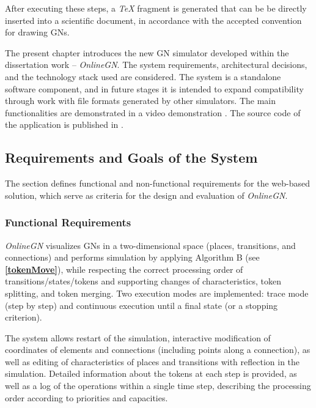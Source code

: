 	\vspace{-0.45cm}
	
	After executing these steps, a \textit{TeX} fragment is generated that can be be directly inserted into a scientific document, in accordance with the accepted convention for drawing GNs.
	
	
	\hspace*{2.5em}The present chapter introduces the new GN simulator developed within the dissertation work -- \textit{OnlineGN}. The system requirements, architectural decisions, and the technology stack used are considered. The system is a standalone software component, and in future stages it is intended to expand compatibility through work with file formats generated by other simulators. The main functionalities are demonstrated in a video demonstration \cite{DIS-OnlineGN-video}. The source code of the application is published in \cite{phdThesisOnlineGNRepo}.
	
	\subsection{Requirements and Goals of the System}
	
	\hspace*{2.5em}The section defines functional and non-functional requirements for the web-based solution, which serve as criteria for the design and evaluation of \textit{OnlineGN}.
	
	\subsubsection{Functional Requirements}
	\hspace*{2.5em}\textit{OnlineGN} visualizes GNs in a two-dimensional space (places, transitions, and connections) and performs simulation by applying Algorithm B (see \textbf{\ref{tokenMove}}), while respecting the correct processing order of transitions/states/tokens and supporting changes of characteristics, token splitting, and token merging. Two execution modes are implemented: trace mode (step by step) and continuous execution until a final state (or a stopping criterion).
	
	The system allows restart of the simulation, interactive modification of coordinates of elements and connections (including points along a connection), as well as editing of characteristics of places and transitions with reflection in the simulation. Detailed information about the tokens at each step is provided, as well as a log of the operations within a single time step, describing the processing order according to priorities and capacities.
	
